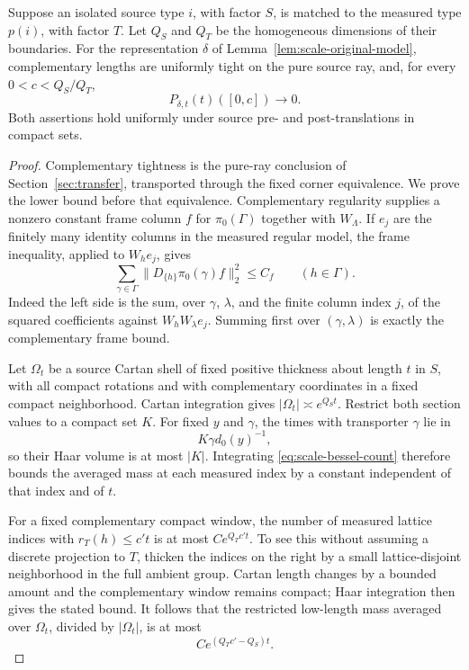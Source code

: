 \begin{lemma}\label{lem:scale-entropy}
Suppose an isolated source type \(i\), with factor \(S\),
is matched to the measured type \(p(i)\), with factor \(T\).
Let \(Q_S\) and \(Q_T\) be the homogeneous dimensions of their boundaries.
For the representation \(\delta\) of
Lemma~\ref{lem:scale-original-model}, complementary lengths
are uniformly tight on the pure source ray, and, for every
\(0<c<Q_S/Q_T\),
\begin{equation}
 P_{\delta,t}(t)([0,c])\longrightarrow0.
 \label{eq:scale-entropy}
\end{equation}
Both assertions hold uniformly under source pre- and
post-translations in compact sets.
\end{lemma}

\begin{proof}
Complementary tightness is the pure-ray conclusion of
Section~\ref{sec:transfer}, transported through the fixed corner
equivalence.  We prove the lower bound before
that equivalence.  Complementary regularity supplies a
nonzero constant frame column \(f\) for
\(\pi_0(\Gamma)\) together with \(W_\Lambda\).  If \(e_j\)
are the finitely many identity columns in the measured
regular model, the frame inequality, applied to \(W_h e_j\),
gives
\begin{equation}
 \sum_{\gamma\in\Gamma}
 \|D_{\{h\}}\pi_0(\gamma)f\|_2^2\le C_f
 \qquad(h\in\Gamma).
 \label{eq:scale-bessel-count}
\end{equation}
Indeed the left side is the sum, over \(\gamma\), \(\lambda\),
and the finite column index \(j\), of the squared coefficients
against \(W_hW_\lambda e_j\).  Summing first over
\((\gamma,\lambda)\) is exactly the complementary frame bound.

Let \(\Omega_t\) be a source Cartan shell of fixed positive
thickness about length \(t\) in \(S\), with all compact
rotations and with complementary coordinates in a fixed
compact neighborhood.  Cartan integration gives
\(|\Omega_t|\asymp e^{Q_S t}\).  Restrict both section values
to a compact set \(K\).  For fixed \(y\) and \(\gamma\),
the times with transporter \(\gamma\) lie in
\[
 K\gamma d_0(y)^{-1},
\]
so their Haar volume is at most \(|K|\).  Integrating
\eqref{eq:scale-bessel-count} therefore bounds the averaged
mass at each measured index by a constant independent of
that index and of \(t\).

For a fixed complementary compact window, the number of
measured lattice indices with \(r_T(h)\le c't\) is at most
\(C e^{Q_Tc't}\).  To see this without assuming a discrete
projection to \(T\), thicken the indices on the right by a
small lattice-disjoint neighborhood in the full ambient
group.  Cartan length changes by a bounded amount and the
complementary window remains compact; Haar integration
then gives the stated bound.  It follows that the restricted
low-length mass averaged over \(\Omega_t\), divided by
\(|\Omega_t|\), is at most
\begin{equation}
 C e^{(Q_Tc'-Q_S)t}.
 \label{eq:scale-volume-ratio}
\end{equation}


\end{proof}
